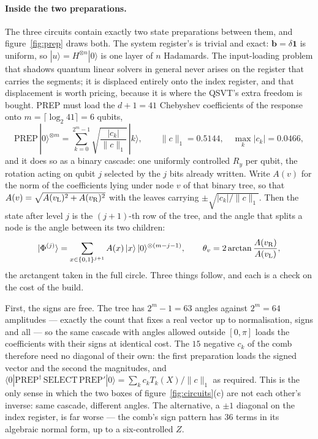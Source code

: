 \documentclass[11pt,a4paper]{article}
\begin{document}
\paragraph{Inside the two preparations.} The three circuits contain exactly
two state preparations between them, and figure~\ref{fig:prep} draws both.
The system register's is trivial and exact: $\mathbf{b}=\delta\mathbf{1}$ is
uniform, so $|u\rangle=H^{\otimes n}|0\rangle$ is one layer of $n$ Hadamards.
The input-loading problem that shadows quantum linear solvers in general never
arises on the register that carries the segments; it is displaced entirely
onto the index register, and that displacement is worth pricing, because it is
where the QSVT's extra freedom is bought. PREP must load the $d+1=41$
Chebyshev coefficients of the response onto $m=\lceil\log_2 41\rceil=6$
qubits,
\begin{equation}
\mathrm{PREP}\,|0\rangle^{\otimes m}=\sum_{k=0}^{2^{m}-1}
\sqrt{\frac{|c_k|}{\lVert c\rVert_1}}\,|k\rangle ,
\qquad
\lVert c\rVert_1=0.5144,\quad \max_k|c_k|=0.0466 ,
\label{eq:prep}
\end{equation}
and it does so as a binary cascade: one uniformly controlled $R_y$ per qubit,
the rotation acting on qubit $j$ selected by the $j$ bits already written.
Write $A(v)$ for the norm of the coefficients lying under node $v$ of that
binary tree, so that $A(v)=\sqrt{A(v_{\rm L})^{2}+A(v_{\rm R})^{2}}$ with the
leaves carrying $\pm\sqrt{|c_k|/\lVert c\rVert_1}$. Then the state after
level $j$ is the $(j{+}1)$-th row of the tree, and the angle that splits a
node is the angle between its two children:
\begin{equation}
|\Phi^{(j)}\rangle=\sum_{x\in\{0,1\}^{j+1}}A(x)\,|x\rangle\,
|0\rangle^{\otimes(m-j-1)} ,
\qquad
\theta_v=2\arctan\frac{A(v_{\rm R})}{A(v_{\rm L})} ,
\label{eq:preptree}
\end{equation}
the arctangent taken in the full circle. Three things follow, and each is a
check on the cost of the build.

First, the signs are free. The tree has $2^{m}-1=63$ angles against $2^{m}=64$
amplitudes --- exactly the count that fixes a real vector up to normalisation,
signs and all --- so the same cascade with angles allowed outside $[0,\pi]$
loads the coefficients with their signs at identical cost. The $15$ negative
$c_k$ of the comb therefore need no diagonal of their own: the first
preparation loads the signed vector and the second the magnitudes, and
$\langle0|\mathrm{PREP}^{\dagger}\,\mathrm{SELECT}\,\mathrm{PREP}'|0\rangle=
\sum_kc_kT_k(X)/\lVert c\rVert_1$ as required. This is the only sense in which
the two boxes of figure~\ref{fig:circuits}(c) are not each other's inverse:
same cascade, different angles. The alternative, a $\pm1$ diagonal on the
index register, is far worse --- the comb's sign pattern has $36$ terms in its
algebraic normal form, up to a six-controlled $Z$.
\end{document}
